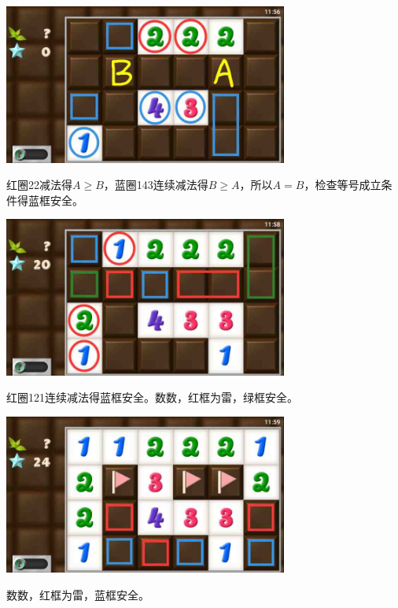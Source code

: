 \subsection{} %
\begin{center}
    \includegraphics[width=0.7\textwidth]{puzzlelow/170-1.jpg}
\end{center}
红圈22减法得$A\ge B$，蓝圈143连续减法得$B\ge A$，所以$A=B$，检查等号成立条件得蓝框安全。
\begin{center}
    \includegraphics[width=0.7\textwidth]{puzzlelow/170-2.jpg}
\end{center}
红圈121连续减法得蓝框安全。数数，红框为雷，绿框安全。
\begin{center}
    \includegraphics[width=0.7\textwidth]{puzzlelow/170-3.jpg}
\end{center}
数数，红框为雷，蓝框安全。

